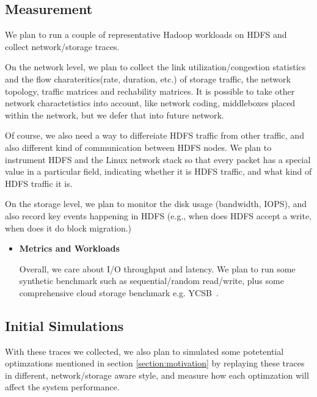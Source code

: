 \subsection {\bf Measurement}
We plan to run a couple of representative Hadoop workloads on HDFS and collect network/storage traces.

On the network level, we plan to collect the link utilization/congestion statistics and the flow charateritics(rate, duration, etc.) of storage traffic, the network topology, traffic matrices and rechability matrices. It is possible to take other network charactetistics into account, like network coding, middleboxes placed within the network, but we defer that into future network. 

Of course, we also need a way to differeiate HDFS traffic from other traffic, and also different kind of communication between HDFS nodes. We plan to instrument HDFS and the Linux network stack so that every packet has a special value in a particular field, indicating whether it is HDFS traffic, and what kind of HDFS traffic it is.

On the storage level, we plan to monitor the disk usage (bandwidth, IOPS), and also record key events happening in HDFS (e.g., when does HDFS accept a write, when does it do block migration.) 


\begin{itemize}
	\item {\bf Metrics and Workloads}

Overall, we care about I/O throughput and latency. We plan to run some synthetic benchmark such as sequential/random read/write, plus some comprehensive cloud storage benchmark e.g. YCSB~\cite{YCSB}.

	

\end{itemize}

\subsection{\bf Initial Simulations}
With these traces we collected, we also plan to simulated some potetential optimzations mentioned in section \ref{section:motivation} by replaying these traces in different, network/storage aware style, and measure how each optimzation will affect the system performance.


